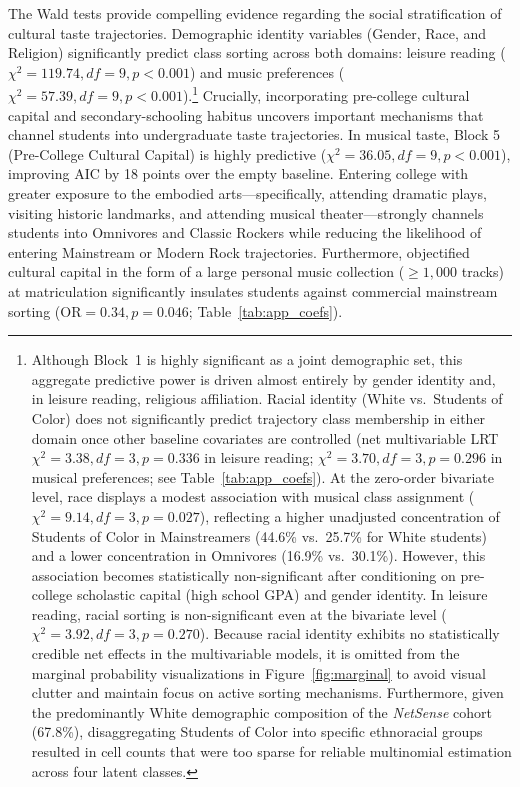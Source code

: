 \documentclass[12pt]{article}
\begin{document}
The Wald tests provide compelling evidence regarding the social stratification of cultural taste trajectories. Demographic identity variables (Gender, Race, and Religion) significantly predict class sorting across both domains: leisure reading ($\chi^2 = 119.74, df = 9, p < 0.001$) and music preferences ($\chi^2 = 57.39, df = 9, p < 0.001$).\footnote{Although Block~1 is highly significant as a joint demographic set, this aggregate predictive power is driven almost entirely by gender identity and, in leisure reading, religious affiliation. Racial identity (White vs.\ Students of Color) does not significantly predict trajectory class membership in either domain once other baseline covariates are controlled (net multivariable LRT $\chi^2 = 3.38, df = 3, p = 0.336$ in leisure reading; $\chi^2 = 3.70, df = 3, p = 0.296$ in musical preferences; see Table~\ref{tab:app_coefs}). At the zero-order bivariate level, race displays a modest association with musical class assignment ($\chi^2 = 9.14, df = 3, p = 0.027$), reflecting a higher unadjusted concentration of Students of Color in Mainstreamers (44.6\% vs.\ 25.7\% for White students) and a lower concentration in Omnivores (16.9\% vs.\ 30.1\%). However, this association becomes statistically non-significant after conditioning on pre-college scholastic capital (high school GPA) and gender identity. In leisure reading, racial sorting is non-significant even at the bivariate level ($\chi^2 = 3.92, df = 3, p = 0.270$). Because racial identity exhibits no statistically credible net effects in the multivariable models, it is omitted from the marginal probability visualizations in Figure~\ref{fig:marginal} to avoid visual clutter and maintain focus on active sorting mechanisms. Furthermore, given the predominantly White demographic composition of the \textit{NetSense} cohort (67.8\%), disaggregating Students of Color into specific ethnoracial groups resulted in cell counts that were too sparse for reliable multinomial estimation across four latent classes.} Crucially, incorporating pre-college cultural capital and secondary-schooling habitus uncovers important mechanisms that channel students into undergraduate taste trajectories. In musical taste, Block 5 (Pre-College Cultural Capital) is highly predictive ($\chi^2 = 36.05, df = 9, p < 0.001$), improving AIC by 18 points over the empty baseline. Entering college with greater exposure to the embodied arts—specifically, attending dramatic plays, visiting historic landmarks, and attending musical theater—strongly channels students into Omnivores and Classic Rockers while reducing the likelihood of entering Mainstream or Modern Rock trajectories. Furthermore, objectified cultural capital in the form of a large personal music collection ($\ge 1,000$ tracks) at matriculation significantly insulates students against commercial mainstream sorting ($\text{OR} = 0.34, p = 0.046$; Table~\ref{tab:app_coefs}).
\end{document}
